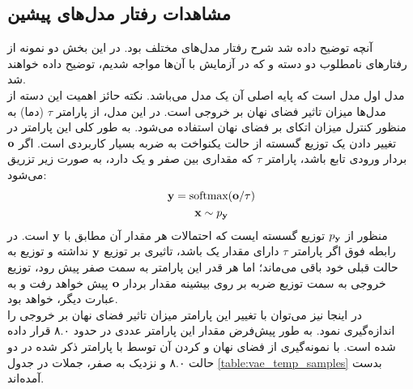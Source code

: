 \subsection{مشاهدات رفتار مدل‌های پیشین}
آنچه توضیح داده شد شرح رفتار مدل‌های مختلف بود. در این بخش دو نمونه از رفتارهای نامطلوب دو دسته \gan{} و \vae{} که در آزمایش با آن‌ها مواجه شدیم، توضیح داده خواهند شد.
\\
مدل اول مدل \towardctg{} است که پایه اصلی آن یک مدل \vae{} می‌باشد. نکته حائز اهمیت این دسته از مدل‌ها میزان تاثیر فضای نهان بر خروجی \decoder{} است. در این مدل، از پارامتر $\tau$ (دما) به منظور کنترل میزان اتکای \decoder{} بر فضای نهان استفاده می‌شود. به طور کلی این پارامتر در تغییر دادن یک توزیع گسسته از حالت یکنواخت به ضربه بسیار کاربردی است. اگر ${\bf o}$ بردار ورودی تابع \softmax{} باشد، پارامتر $\tau{}$ که مقداری بین صفر و یک دارد، به صورت زیر تزریق می‌شود:
\begin{gather}
	{\bf y} = \text{softmax}({\bf o}/\tau) \\
	{\bf x} \sim p_{\bf y} \nonumber
\end{gather}
منظور از $p_{\bf y}$ توزیع گسسته ایست که احتمالات هر مقدار آن مطابق با ${\bf y}$ است. در رابطه فوق اگر پارامتر $\tau$ دارای مقدار یک باشد، تاثیری بر توزیع ${\bf y}$ نداشته و توزیع به حالت قبلی خود باقی می‌ماند؛ اما هر قدر این پارامتر به سمت صفر پیش رود، توزیع خروجی \softmax{} به سمت توزیع ضربه بر روی بیشینه مقدار بردار ${\bf o}$ پیش خواهد رفت و به عبارت دیگر، \greedydecoding{} خواهد بود. \\
در اینجا نیز می‌توان با تغییر این پارامتر میزان تاثیر فضای نهان بر خروجی \decoder{} را اندازه‌گیری نمود. به طور پیش‌فرض مقدار این پارامتر عددی در حدود ۸.۰ قرار داده شده است. با نمونه‌گیری از فضای نهان و \decode{} کردن آن توسط \decoder{} با پارامتر ذکر شده در دو حالت ۸.۰ و نزدیک به صفر، جملات در جدول 
\ref{table:vae_temp_samples}
بدست آمده‌اند.
